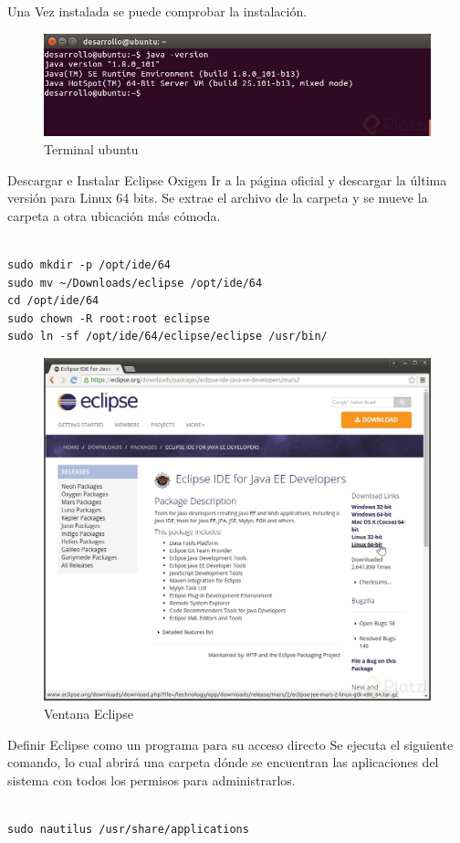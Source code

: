 Una Vez instalada se puede comprobar la instalación.

\begin{figure}[H]
	\centering
	\includegraphics[width=0.7\linewidth]{figuras/ecli-1}
	\caption{Terminal ubuntu}
	\label{fig:ecli1}
\end{figure}

Descargar e Instalar Eclipse Oxigen
Ir a la página oficial y descargar la última versión para Linux 64 bits. Se extrae el archivo de la carpeta y se mueve la carpeta a otra ubicación más cómoda.

\begin{lstlisting}

sudo mkdir -p /opt/ide/64
sudo mv ~/Downloads/eclipse /opt/ide/64
cd /opt/ide/64
sudo chown -R root:root eclipse
sudo ln -sf /opt/ide/64/eclipse/eclipse /usr/bin/

\end{lstlisting}

\begin{figure}[H]
	\centering
	\includegraphics[width=0.6\linewidth]{figuras/ecli-2}
	\caption{Ventana Eclipse}
	\label{fig:ecli2}
\end{figure}


Definir Eclipse como un programa para su acceso directo
Se ejecuta el siguiente comando, lo cual abrirá una carpeta dónde se encuentran las aplicaciones del sistema con todos los permisos para administrarlos.

\begin{lstlisting}

sudo nautilus /usr/share/applications
\end{lstlisting}

